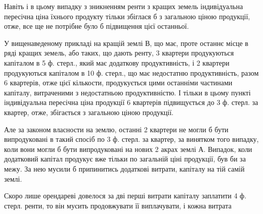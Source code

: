 Навіть і в цьому випадку з зникненням ренти з кращих земель індивідуальна
пересічна ціна їхнього продукту тільки збіглася б з загальною ціною продукції,
отже, все ще не потрібне було б підвищення цієї останньої.

У вищенаведеному прикладі на кращій землі В, що має, проте останнє
місце в ряді кращих земель, або таких, що дають ренту, 3 квартери продукуються
капіталом в 5 ф. стерл., який має додаткову продуктивність, і 2 квартери
продукуються капіталом в 10 ф. стерл., що має недостатню продуктивність,
разом 6 квартерів, отже  цієї кількости, продукується цими
останніми частинами капіталу, витраченими з недостатньою продуктивністю.
І тільки в цьому пункті індивідуальна пересічна ціна продукції 6 квартерів
підвищується до 3 ф. стерл. за квартер, отже, збігається з загальною ціною
продукції.

Але за законом власности на землю, останні 2 квартери не могли б бути
випродуковані в такий спосіб по 3 ф. стерл. за квартер, за винятком того
випадку, коли вони могли б бути випродуковані на нових 2 акрах землі
А. Випадок, коли додатковий капітал продукує вже тільки по загальній ціні
продукції, був би за межу. За нею мусили б припинитись додаткові витрати,
капіталу на тій самій землі.

Скоро лише орендареві довелося за дві перші витрати капіталу заплатити
4 ф. стерл. ренти, то він мусить продовжувати її виплачувати, і кожна витрата
\parbreak{}  %

